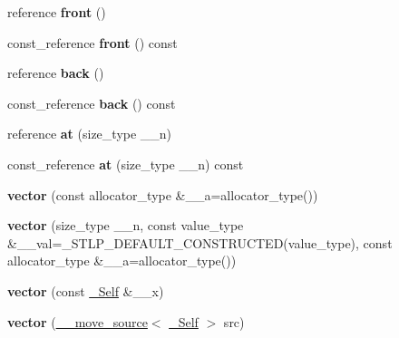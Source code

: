 \begin{DoxyCompactItemize}
\mbox{\label{structvector_a66b28c19e75658deb328ef3833997032}} 
reference {\bfseries front} ()
\item 
\mbox{\label{structvector_a96ceb5fda806c57779fdf6205e9cde9d}} 
const\+\_\+reference {\bfseries front} () const
\item 
\mbox{\label{structvector_a3652040e07cee889a7bd4efee5f18532}} 
reference {\bfseries back} ()
\item 
\mbox{\label{structvector_afc391e6b19dc3624fe9f017844a54ce6}} 
const\+\_\+reference {\bfseries back} () const
\item 
\mbox{\label{structvector_aa87917d77fcc1920cc26b8335e52db4b}} 
reference {\bfseries at} (size\+\_\+type \+\_\+\+\_\+n)
\item 
\mbox{\label{structvector_adee4d05f69a240fba15456cde96efa7e}} 
const\+\_\+reference {\bfseries at} (size\+\_\+type \+\_\+\+\_\+n) const
\item 
\mbox{\label{structvector_a742ee2395e0ccfd466fc7facb0cbff0e}} 
{\bfseries vector} (const allocator\+\_\+type \&\+\_\+\+\_\+a=allocator\+\_\+type())
\item 
\mbox{\label{structvector_a13fc4fead2a0de3bf6c87214907a401e}} 
{\bfseries vector} (size\+\_\+type \+\_\+\+\_\+n, const value\+\_\+type \&\+\_\+\+\_\+val=\+\_\+\+S\+T\+L\+P\+\_\+\+D\+E\+F\+A\+U\+L\+T\+\_\+\+C\+O\+N\+S\+T\+R\+U\+C\+T\+ED(value\+\_\+type), const allocator\+\_\+type \&\+\_\+\+\_\+a=allocator\+\_\+type())
\item 
\mbox{\label{structvector_a3059188b3b0449014b97b57ffca94e37}} 
{\bfseries vector} (const \hyperlink{structvector}{\+\_\+\+Self} \&\+\_\+\+\_\+x)
\item 
\mbox{\label{structvector_a454e6a51108b8425877350149688b493}} 
{\bfseries vector} (\hyperlink{class____move__source}{\+\_\+\+\_\+move\+\_\+source}$<$ \hyperlink{structvector}{\+\_\+\+Self} $>$ src)
\item 
\mbox{\label{structvector_a8680f0f437d7168763c4599d11641b7c}} 

\end{DoxyCompactItemize}
